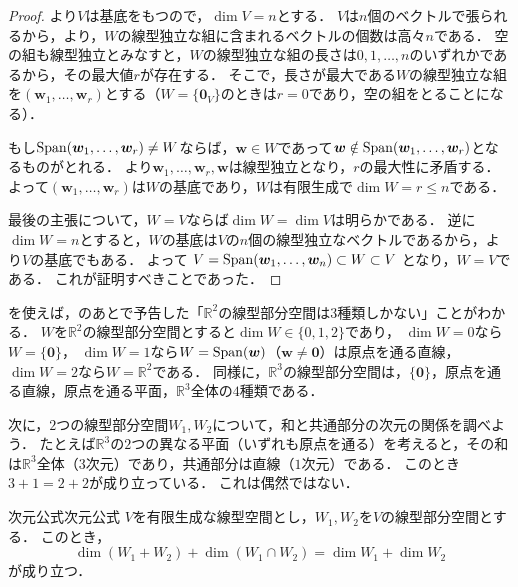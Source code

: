 \begin{tleftbar}
\begin{proof}
  より$V$は基底をもつので，$\dim V = n$とする．
  $V$は$n$個のベクトルで張られるから，より，$W$の線型独立な組に含まれるベクトルの個数は高々$n$である．
  空の組も線型独立とみなすと，$W$の線型独立な組の長さは$0, 1, \dots, n$のいずれかであるから，その最大値$r$が存在する．
  そこで，長さが最大である$W$の線型独立な組を$(\bm{w}_1, \dots, \bm{w}_r)$とする（$W = \{\bm{0}_V\}$のときは$r = 0$であり，空の組をとることになる）．

  もし$\operatorname{Span}(\bm{w}_1, \dots, \bm{w}_r) \ne W$ならば，$\bm{w} \in W$であって$\bm{w} \notin \operatorname{Span}(\bm{w}_1, \dots, \bm{w}_r)$となるものがとれる．
  より$\bm{w}_1, \dots, \bm{w}_r, \bm{w}$は線型独立となり，$r$の最大性に矛盾する．
  よって$(\bm{w}_1, \dots, \bm{w}_r)$は$W$の基底であり，$W$は有限生成で$\dim W = r \le n$である．

  最後の主張について，$W = V$ならば$\dim W = \dim V$は明らかである．
  逆に$\dim W = n$とすると，$W$の基底は$V$の$n$個の線型独立なベクトルであるから，より$V$の基底でもある．
  よって
  $V = \operatorname{Span}(\bm{w}_1, \dots, \bm{w}_n) \subset W \subset V$
  となり，$W = V$である．
  これが証明すべきことであった．
\end{proof}
\end{tleftbar}

を使えば，のあとで予告した「$\mathbb{R}^2$の線型部分空間は$3$種類しかない」ことがわかる．
$W$を$\mathbb{R}^2$の線型部分空間とすると$\dim W\in\{0,1,2\}$であり，
$\dim W=0$なら$W=\{\bm{0}\}$，
$\dim W=1$なら$W=\operatorname{Span}(\bm{w})$（$\bm{w}\ne\bm{0}$）は原点を通る直線，
$\dim W=2$なら$W=\mathbb{R}^2$である．
同様に，$\mathbb{R}^3$の線型部分空間は，$\{\bm{0}\}$，原点を通る直線，原点を通る平面，$\mathbb{R}^3$全体の$4$種類である．

次に，$2$つの線型部分空間$W_1,W_2$について，和と共通部分の次元の関係を調べよう．
たとえば$\mathbb{R}^3$の$2$つの異なる平面（いずれも原点を通る）を考えると，その和は$\mathbb{R}^3$全体（$3$次元）であり，共通部分は直線（$1$次元）である．
このとき$3+1=2+2$が成り立っている．
これは偶然ではない．

\begin{theorem}{次元公式}{次元公式}
  $V$を有限生成な線型空間とし，$W_1, W_2$を$V$の線型部分空間とする．
  このとき，
  \[
    \dim(W_1 + W_2) + \dim(W_1 \cap W_2) = \dim W_1 + \dim W_2
  \]
  が成り立つ．
\end{theorem}


